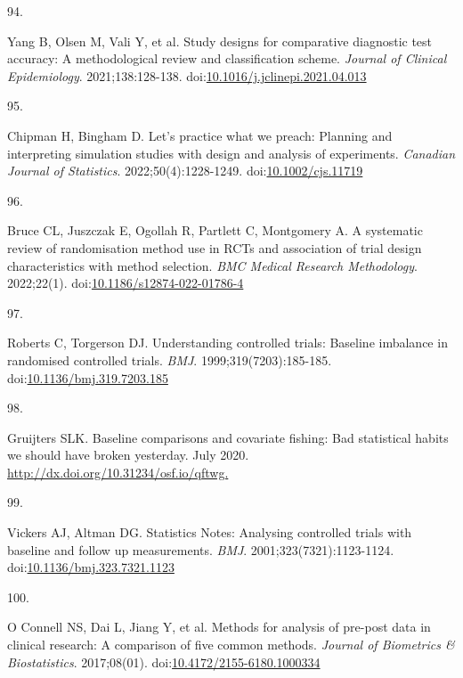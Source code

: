 \documentclass[
]{book}
\newlength{\cslhangindent}
\newlength{\csllabelwidth}
\newlength{\cslentryspacingunit} %
\newenvironment{CSLReferences}[2] %
 {%
  \setlength{\parindent}{0pt}
  \ifodd #1
  \let\oldpar\par
  \def\par{\hangindent=\cslhangindent\oldpar}
  \fi
  \setlength{\parskip}{#2\cslentryspacingunit}
 }%
 {}
\newcommand{\CSLLeftMargin}[1]{\parbox[t]{\csllabelwidth}{#1}}
\newcommand{\CSLRightInline}[1]{\parbox[t]{\linewidth - \csllabelwidth}{#1}\break}
\begin{document}
\begin{CSLReferences}{0}{0}
\leavevmode{}%
\CSLLeftMargin{94. }%
\CSLRightInline{Yang B, Olsen M, Vali Y, et al. Study designs for comparative diagnostic test accuracy: A methodological review and classification scheme. \emph{Journal of Clinical Epidemiology}. 2021;138:128-138. doi:\href{https://doi.org/10.1016/j.jclinepi.2021.04.013}{10.1016/j.jclinepi.2021.04.013}}

\leavevmode{}%
\CSLLeftMargin{95. }%
\CSLRightInline{Chipman H, Bingham D. Let's practice what we preach: Planning and interpreting simulation studies with design and analysis of experiments. \emph{Canadian Journal of Statistics}. 2022;50(4):1228-1249. doi:\href{https://doi.org/10.1002/cjs.11719}{10.1002/cjs.11719}}

\leavevmode{}%
\CSLLeftMargin{96. }%
\CSLRightInline{Bruce CL, Juszczak E, Ogollah R, Partlett C, Montgomery A. A systematic review of randomisation method use in RCTs and association of trial design characteristics with method selection. \emph{BMC Medical Research Methodology}. 2022;22(1). doi:\href{https://doi.org/10.1186/s12874-022-01786-4}{10.1186/s12874-022-01786-4}}

\leavevmode{}%
\CSLLeftMargin{97. }%
\CSLRightInline{Roberts C, Torgerson DJ. Understanding controlled trials: Baseline imbalance in randomised controlled trials. \emph{BMJ}. 1999;319(7203):185-185. doi:\href{https://doi.org/10.1136/bmj.319.7203.185}{10.1136/bmj.319.7203.185}}

\leavevmode{}%
\CSLLeftMargin{98. }%
\CSLRightInline{Gruijters SLK. Baseline comparisons and covariate fishing: Bad statistical habits we should have broken yesterday. July 2020. \href{http://dx.doi.org/10.31234/osf.io/qftwg}{http://dx.doi.org/10.31234/osf.io/qftwg.}}

\leavevmode{}%
\CSLLeftMargin{99. }%
\CSLRightInline{Vickers AJ, Altman DG. Statistics Notes: Analysing controlled trials with baseline and follow up measurements. \emph{BMJ}. 2001;323(7321):1123-1124. doi:\href{https://doi.org/10.1136/bmj.323.7321.1123}{10.1136/bmj.323.7321.1123}}

\leavevmode{}%
\CSLLeftMargin{100. }%
\CSLRightInline{O Connell NS, Dai L, Jiang Y, et al. Methods for analysis of pre-post data in clinical research: A comparison of five common methods. \emph{Journal of Biometrics \& Biostatistics}. 2017;08(01). doi:\href{https://doi.org/10.4172/2155-6180.1000334}{10.4172/2155-6180.1000334}}


\end{CSLReferences}
\end{document}
